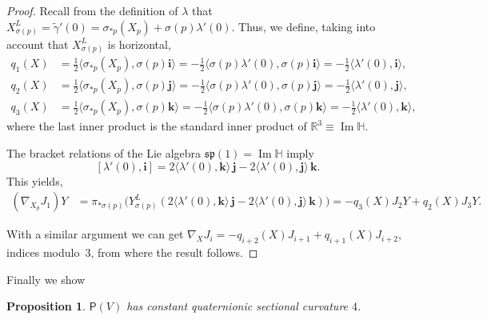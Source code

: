 \documentclass[12pt, a4paper]{amsart}
\newcommand{\g}{\mathfrak}
\newcommand{\R}{\mathbb{R}}
\renewcommand{\H}{\mathbb{H}}
\renewcommand{\Im}{\operatorname{Im}}
\newtheorem{proposition}[theorem]{Proposition}
\theoremstyle{remark}
\begin{document}
\begin{proof}
Recall from the definition of $\lambda$ that 
$X_{\sigma(p)}^L=\tilde{\gamma}'(0)=\sigma_{*p}(X_p)+\sigma(p)\lambda'(0)$.
Thus, we define, taking into account that $X_{\sigma(p)}^L$ is horizontal,
\[
\begin{aligned}
q_1(X)&{}=\frac{1}{2}\langle\sigma_{*p}(X_p),\sigma(p)\mathbf{i}\rangle
=-\frac{1}{2}\langle \sigma(p)\lambda'(0),\sigma(p)\mathbf{i}\rangle
=-\frac{1}{2}\langle \lambda'(0),\mathbf{i}\rangle,\\
q_2(X)&{}=\frac{1}{2}\langle\sigma_{*p}(X_p),\sigma(p)\mathbf{j}\rangle
=-\frac{1}{2}\langle \sigma(p)\lambda'(0),\sigma(p)\mathbf{j}\rangle
=-\frac{1}{2}\langle \lambda'(0),\mathbf{j}\rangle,\\
q_3(X)&{}=\frac{1}{2}\langle\sigma_{*p}(X_p),\sigma(p)\mathbf{k}\rangle
=-\frac{1}{2}\langle \sigma(p)\lambda'(0),\sigma(p)\mathbf{k}\rangle
=-\frac{1}{2}\langle \lambda'(0),\mathbf{k}\rangle,
\end{aligned}
\]
where the last inner product is the standard inner product of $\R^3\equiv\Im\H$.

The bracket relations of the Lie algebra $\g{sp}(1)=\Im\H$ imply
\[
[\lambda'(0),\mathbf{i}]
=2\langle\lambda'(0),\mathbf{k}\rangle\,\mathbf{j}-2\langle\lambda'(0),\mathbf{j}\rangle\,\mathbf{k}.
\]
This yields,
\[
\begin{aligned}
(\nabla_{X_p}J_1)Y
&{}=\pi_{*\sigma(p)}\bigl(Y_{\sigma(p)}^L(2\langle\lambda'(0),\mathbf{k}\rangle\,\mathbf{j}-2\langle\lambda'(0),\mathbf{j}\rangle\,\mathbf{k})\bigr)
=-q_3(X)J_2 Y+q_2(X)J_3 Y.
\end{aligned}
\]

With a similar argument we can get $\nabla_X J_i=-q_{i+2}(X)J_{i+1}+q_{i+1}(X)J_{i+2}$, indices modulo~3, from where the result follows.
\end{proof}

Finally we show

\begin{proposition}
$\mathsf{P}(V)$ has constant quaternionic sectional curvature $4$.
\end{proposition}
\end{document}
